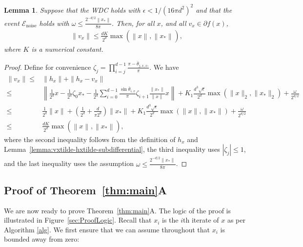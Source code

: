 \documentclass[11pt]{article}
\newtheorem{lemma}[theorem]{Lemma}
\newcommand{\eps}{\epsilon}
\newcommand{\xo}{x_\ast}
\newcommand{\Tnorm}{}
\newcommand\norm[2][\Tnorm]{\ensuremath{{\left\|#2\right\|}_{#1}}}
\newcommand\eventnoisesmall{\mathcal E_{\text{noise}}}
\newcommand\stepdir[1]{\tilde v_{#1}}
\newcommand{\whcomm}[2]{{\color{black} #1}{\color{black} #2}} %
\begin{document}
\begin{lemma}
Suppose that the WDC holds with $\epsilon < 1/(16 \pi d^2)^2$ and that the event $\eventnoisesmall$ holds with $\omega \leq \frac{2^{-d/2} \norm{\xo}}{8\pi}$. Then, for all $x$, 
and all $v_x \in \partial f(x)$,
\begin{align}
\label{GA:e23}
\|v_x\|
\leq
\frac{dK}{2^d} \max(\norm{x}, \norm{\xo}),
\end{align}
where $K$ is a numerical constant.
\end{lemma}
\begin{proof}
Define for convenience $\zeta_j=\prod_{i = j}^{d - 1} \frac{\pi - \bar{\theta}_{j, x, x_*}}{\pi}$.
We have
\begin{align}
\|v_x\|
\leq&
\|h_{x}\| + \|h_{x} - v_x\| \nonumber \\
\leq&
\left\|\frac{1}{2^d} x - \frac{1}{2^d} \zeta_{0} x_* - \frac{1}{2^d} \sum_{i = 0}^{d - 1} \frac{\sin \bar{\theta}_{i,x}}{\pi} \zeta_{i + 1}  \frac{\norm{\xo}}{\norm{x}} x \right\|
+
K_1 \frac{d^3 \sqrt{\eps}}{2^d} \max ( \|x\|_2, \| \xo\|_2)
+
\frac{\omega}{2^{d/2}}
\nonumber \\
\leq&
\frac{1}{2^d} \|x\| + \left( \frac{1}{2^d}  + \frac{d}{\pi 2^d} \right) \|x_*\| + K_1 \frac{d^3 \sqrt{\epsilon}}{2^d} \max(\|x\|, \|x_*\|) + \frac{\omega}{2^{d/2}} \nonumber \\
\leq&
\frac{dK}{2^d} \max(\norm{x}, \norm{\xo}), \nonumber
\end{align}
where the second inequality follows from the definition of $h_x$ and Lemma~\ref{lemma:vxtilde-hxtilde-subdifferential}, the third inequality uses $| \zeta_j | \leq 1$,
and the last inequality uses the assumption $\omega \leq \frac{2^{-d/2} \norm{\xo}}{8\pi}$.
\end{proof}







\subsection{Proof of Theorem~\ref{thm:main}A}

We are now ready to prove Theorem~\ref{thm:main}A.
The logic of the proof is illustrated in Figure~\ref{sec:ProofLogic}.
Recall that $x_i$ is the $i$th iterate of $x$ as per Algorithm \ref{alg}.
We first ensure that we can assume throughout that $x_i$ is bounded away from zero:
\end{document}
